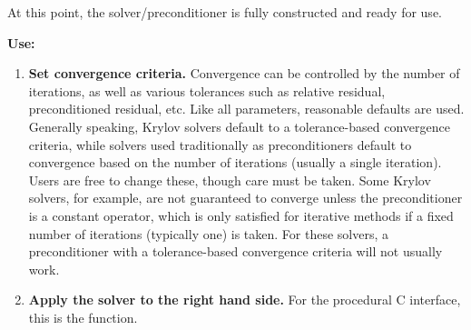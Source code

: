 At this point, the solver/preconditioner is fully constructed and
ready for use.

{\bf Use:}

\begin{enumerate}

\item
{\bf Set convergence criteria.} Convergence can be controlled by the
number of iterations, as well as various tolerances such as relative
residual, preconditioned residual, etc.  Like all parameters,
reasonable defaults are used. Generally speaking, Krylov solvers
default to a tolerance-based convergence criteria, while solvers used
traditionally as preconditioners default to convergence based on the
number of iterations (usually a single iteration). Users are free to
change these, though care must be taken. Some Krylov solvers, for
example, are not guaranteed to converge unless the preconditioner is a
constant operator, which is only satisfied for iterative methods if a
fixed number of iterations (typically one) is taken.  For these
solvers, a preconditioner with a tolerance-based convergence criteria
will not usually work.

\item
{\bf Apply the solver to the right hand side.} For the procedural C
interface, this is the  function. 

\end{enumerate}
